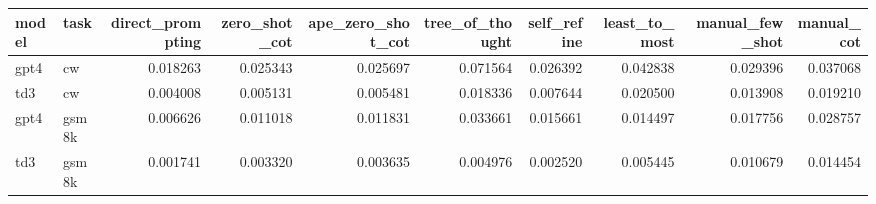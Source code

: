 \begin{tabular}{llrrrrrrrr}
\toprule
model & task & direct_prompting & zero_shot_cot & ape_zero_shot_cot & tree_of_thought & self_refine & least_to_most & manual_few_shot & manual_cot \\
\midrule
gpt4 & cw & 0.018263 & 0.025343 & 0.025697 & 0.071564 & 0.026392 & 0.042838 & 0.029396 & 0.037068 \\
td3 & cw & 0.004008 & 0.005131 & 0.005481 & 0.018336 & 0.007644 & 0.020500 & 0.013908 & 0.019210 \\
gpt4 & gsm8k & 0.006626 & 0.011018 & 0.011831 & 0.033661 & 0.015661 & 0.014497 & 0.017756 & 0.028757 \\
td3 & gsm8k & 0.001741 & 0.003320 & 0.003635 & 0.004976 & 0.002520 & 0.005445 & 0.010679 & 0.014454 \\
\bottomrule
\end{tabular}
